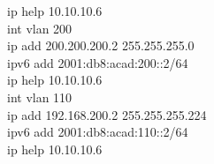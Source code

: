 \documentclass[a4paper, 12pt]{article}
\begin{document}
{\hspace*{2cm}ip help 10.10.10.6\\
\hspace*{2cm}int vlan 200\\
\hspace*{2cm}ip add 200.200.200.2 255.255.255.0\\
\hspace*{2cm}ipv6 add 2001:db8:acad:200::2/64\\
\hspace*{2cm}ip help 10.10.10.6\\
\hspace*{2cm}int vlan 110\\
\hspace*{2cm}ip add 192.168.200.2 255.255.255.224\\
\hspace*{2cm}ipv6 add 2001:db8:acad:110::2/64\\
\hspace*{2cm}ip help 10.10.10.6\\}
\end{document}
